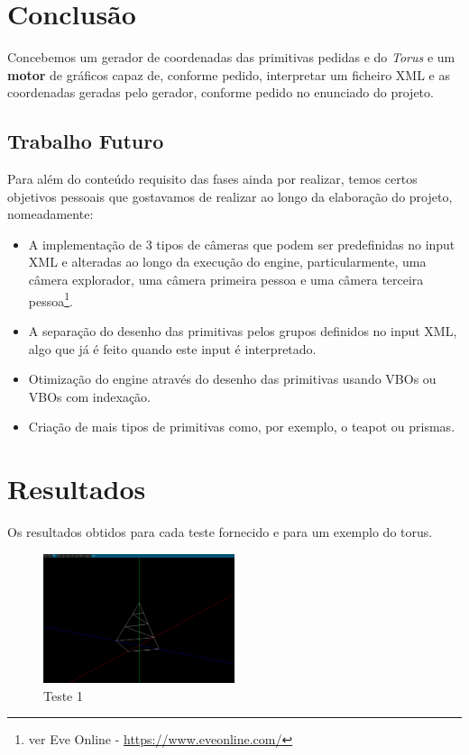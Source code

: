 \documentclass[14pt, a4 paper]{article}
\begin{document}
\section{Conclusão} \label{chap:conclusion}

Concebemos um gerador de coordenadas das primitivas pedidas e do \textit{Torus} e um \textbf{motor} de
gráficos capaz de, conforme pedido, interpretar um ficheiro XML e as coordenadas geradas pelo gerador, conforme pedido no enunciado do projeto.

\subsection{Trabalho Futuro}
Para além do conteúdo requisito das fases ainda por realizar, temos certos objetivos pessoais que
gostavamos de realizar ao longo da elaboração do projeto, nomeadamente:
\begin{itemize}
    \item A implementação de $3$ tipos de câmeras que podem ser predefinidas no input XML e alteradas ao
    longo da execução do engine, particularmente, uma câmera explorador, uma câmera primeira pessoa e
    uma câmera terceira pessoa\footnote{ver Eve Online - \url{https://www.eveonline.com/}}.
    \item A separação do desenho das primitivas pelos grupos definidos no input XML, algo que já é feito
    quando este input é interpretado.
    \item Otimização do engine atrav\'es do desenho das primitivas usando VBOs ou VBOs com indexação.
    \item Criação de mais tipos de primitivas como, por exemplo, o teapot ou prismas.
\end{itemize}


\newpage
\section{Resultados} \label{chap:resultado}

Os resultados obtidos para cada teste fornecido e para um exemplo do torus.

\begin{figure}[ht]
\centering
\includegraphics[width=0.5\textwidth]{images/1.png}
\caption{Teste 1}
\end{figure}
\end{document}
